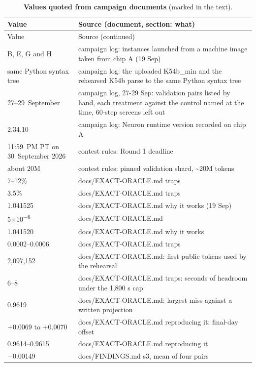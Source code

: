 \begin{longtable}{@{}p{3.6cm}p{12.0cm}@{}}
\caption{\textbf{Values quoted from campaign documents} (marked \docnum{} in the text).}\label{tab:docfacts}\\
\toprule
Value & Source (document, section: what) \\
\midrule
\endfirsthead
\toprule
Value & Source (continued) \\
\midrule
\endhead
\bottomrule
\endlastfoot
B, E, G and H & campaign log: instances launched from a machine image taken from chip A (19 Sep) \\
same Python syntax tree & campaign log: the uploaded K54b\_min and the rehearsed K54b parse to the same Python syntax tree \\
27--29~September & campaign log, 27-29 Sep: validation pairs listed by hand, each treatment against the control named at the time, 60-step screens left out \\
2.34.10 & campaign log: Neuron runtime version recorded on chip A \\
11:59~PM PT on 30~September 2026 & contest rules: Round 1 deadline \\
about 20M & contest rules: pinned validation shard, \textasciitilde{}20M tokens \\
7--12\% & docs/EXACT-ORACLE.md traps \\
3.5\% & docs/EXACT-ORACLE.md traps \\
1.041525 & docs/EXACT-ORACLE.md why it works (19 Sep) \\
5\ensuremath{\times}10\textsuperscript{\ensuremath{-}6} & docs/EXACT-ORACLE.md \\
1.041520 & docs/EXACT-ORACLE.md why it works \\
0.0002--0.0006 & docs/EXACT-ORACLE.md traps \\
2{,}097{,}152 & docs/EXACT-ORACLE.md: first public tokens used by the rehearsal \\
6--8 & docs/EXACT-ORACLE.md traps: seconds of headroom under the 1,800 s cap \\
0.9619 & docs/EXACT-ORACLE.md: largest miss against a written projection \\
\ensuremath{+}0.0069 to \ensuremath{+}0.0070 & docs/EXACT-ORACLE.md reproducing it: final-day offset \\
0.9614--0.9615 & docs/EXACT-ORACLE.md reproducing it \\
\ensuremath{-}0.00149 & docs/FINDINGS.md s3, mean of four pairs \\

\end{longtable}
